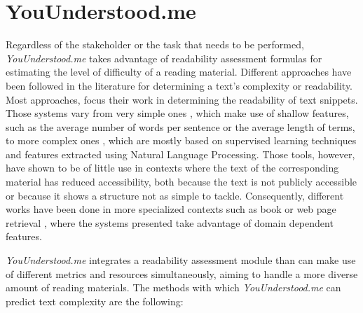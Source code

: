 \documentclass{sig-alternate-05-2015}
\begin{document}
 
\section{YouUnderstood.me}

\noindent
Regardless of the stakeholder or the task that needs to be performed, \textit{YouUnderstood.me}
takes advantage of readability assessment formulas for estimating the level of difficulty of a reading material. Different approaches have been followed in the literature for determining a text's complexity or readability. Most approaches, focus their work in determining the readability of text snippets. Those systems vary from very simple ones \cite{flesch1948new}, which make use of shallow features, such as the average number of words per sentence or the average length of terms, to more complex ones \cite{dell2011read,franccois2012ai,gonzalez2014simple}, which are mostly based on supervised learning techniques and features extracted using Natural Language Processing. Those tools, however, have shown to be of little use in contexts where the text of the corresponding material has reduced accessibility, both because the text is not publicly accessible or because it shows a structure not as simple to tackle. Consequently, different works have been done in more specialized contexts such as book \cite{denning2015readability,pera2014automating} or web page retrieval \cite{lau2006bilingual}, where the systems presented take advantage of domain dependent features.


\textit{YouUnderstood.me} integrates a readability assessment module than can make use of different metrics and resources simultaneously, aiming to handle a more diverse amount of reading materials. The methods with which \textit{YouUnderstood.me} can predict text complexity are the following:
\end{document}
